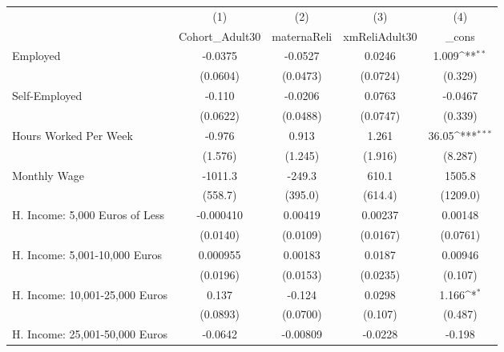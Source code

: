 {
\def\sym#1{\ifmmode^{#1}\else\(^{#1}\)\fi}
\begin{tabular}{l*{4}{c}}
\hline\hline
            &\multicolumn{1}{c}{(1)}&\multicolumn{1}{c}{(2)}&\multicolumn{1}{c}{(3)}&\multicolumn{1}{c}{(4)}\\
            &\multicolumn{1}{c}{Cohort\_Adult30}&\multicolumn{1}{c}{maternaReli}&\multicolumn{1}{c}{xmReliAdult30}&\multicolumn{1}{c}{\_cons}\\
\hline
Employed    &     -0.0375         &     -0.0527         &      0.0246         &       1.009\sym{**} \\
            &    (0.0604)         &    (0.0473)         &    (0.0724)         &     (0.329)         \\
[1em]
Self-Employed&      -0.110         &     -0.0206         &      0.0763         &     -0.0467         \\
            &    (0.0622)         &    (0.0488)         &    (0.0747)         &     (0.339)         \\
[1em]
Hours Worked Per Week&      -0.976         &       0.913         &       1.261         &       36.05\sym{***}\\
            &     (1.576)         &     (1.245)         &     (1.916)         &     (8.287)         \\
[1em]
Monthly Wage&     -1011.3         &      -249.3         &       610.1         &      1505.8         \\
            &     (558.7)         &     (395.0)         &     (614.4)         &    (1209.0)         \\
[1em]
H. Income: 5,000 Euros of Less&   -0.000410         &     0.00419         &     0.00237         &     0.00148         \\
            &    (0.0140)         &    (0.0109)         &    (0.0167)         &    (0.0761)         \\
[1em]
H. Income: 5,001-10,000 Euros&    0.000955         &     0.00183         &      0.0187         &     0.00946         \\
            &    (0.0196)         &    (0.0153)         &    (0.0235)         &     (0.107)         \\
[1em]
H. Income: 10,001-25,000 Euros&       0.137         &      -0.124         &      0.0298         &       1.166\sym{*}  \\
            &    (0.0893)         &    (0.0700)         &     (0.107)         &     (0.487)         \\
[1em]
H. Income: 25,001-50,000 Euros&     -0.0642         &    -0.00809         &     -0.0228         &      -0.198         \\

\end{tabular}}
